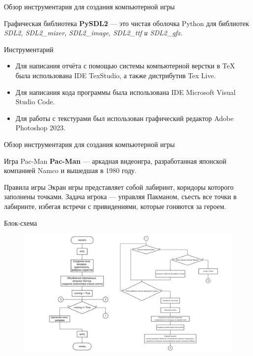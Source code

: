 \documentclass[12pt,a4paper,mathserif]{beamer}
\begin{document}
\begin{frame}{Обзор инструментария для создания компьютерной игры}
    \begin{block}{Графическая библиотека}
            \textbf{PySDL2} --- это чистая оболочка Python для библиотек \textit{SDL2, SDL2\_mixer, SDL2\_image, SDL2\_ttf и SDL2\_gfx}. 
    \end{block}

    \begin{block}{Инструментарий}
    \begin{itemize}
        \item Для написания отчёта с помощью системы компьютерной верстки в \TeX{} была использована IDE TexStudio, а также дистрибутив Tex Live.
        \item Для написания кода программы была использована IDE Microsoft Visual Studio Code.
        \item Для работы с текстурами был использован графический редактор Adobe Photoshop 2023.
    \end{itemize}
    \end{block}
\end{frame}

\begin{frame}{Обзор инструментария для создания компьютерной игры}
    \begin{block}{Игра Pac-Man}
        \textbf{Pac-Man} --- аркадная видеоигра, разработанная японской компанией Namco и вышедшая в 1980 году.
    \end{block}

    \begin{block}{Правила игры}
        Экран игры представляет собой лабиринт, коридоры которого заполнены точками. Задача игрока --- управляя Пакманом, съесть все точки в лабиринте, избегая встречи с привидениями, которые гоняются за героем.
    \end{block}
\end{frame}

\begin{frame}{Блок-схема}
    \begin{figure}[H]
    	\centering
    	\includegraphics[width=1\linewidth]{src/1.png}
    \end{figure}
\end{frame}
\end{document}
